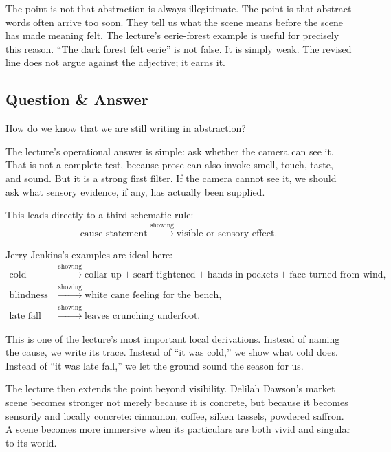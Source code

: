 The point is not that abstraction is always illegitimate. The point is that abstract words often arrive too soon. They tell us what the scene means before the scene has made meaning felt. The lecture's eerie-forest example is useful for precisely this reason. ``The dark forest felt eerie'' is not false. It is simply weak. The revised line does not argue against the adjective; it earns it.

\subsection{Question \& Answer}

How do we know that we are still writing in abstraction?

The lecture's operational answer is simple: ask whether the camera can see it. That is not a complete test, because prose can also invoke smell, touch, taste, and sound. But it is a strong first filter. If the camera cannot see it, we should ask what sensory evidence, if any, has actually been supplied.

This leads directly to a third schematic rule:
\begin{equation}
\text{cause statement} \xrightarrow{\text{showing}} \text{visible or sensory effect}.
\end{equation}

Jerry Jenkins's examples are ideal here:
\begin{align}
\text{cold}
&\xrightarrow{\text{showing}}
\text{collar up} + \text{scarf tightened} + \text{hands in pockets} + \text{face turned from wind},\\
\text{blindness}
&\xrightarrow{\text{showing}}
\text{white cane feeling for the bench},\\
\text{late fall}
&\xrightarrow{\text{showing}}
\text{leaves crunching underfoot}.
\end{align}

This is one of the lecture's most important local derivations. Instead of naming the cause, we write its trace. Instead of ``it was cold,'' we show what cold does. Instead of ``it was late fall,'' we let the ground sound the season for us.

The lecture then extends the point beyond visibility. Delilah Dawson's market scene becomes stronger not merely because it is concrete, but because it becomes sensorily and locally concrete: cinnamon, coffee, silken tassels, powdered saffron. A scene becomes more immersive when its particulars are both vivid and singular to its world.

